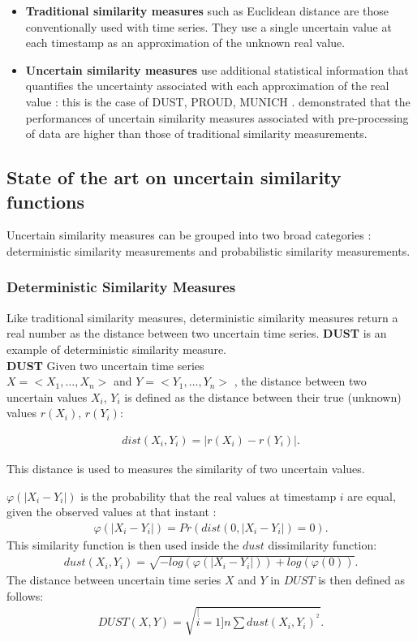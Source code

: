 \begin{itemize}
  \item \textbf{Traditional similarity measures} such as Euclidean distance are those conventionally used with time series. They use a single uncertain value at each timestamp as an approximation of
  the unknown real value.
  \item \textbf{Uncertain similarity measures} use additional statistical information that quantifies the uncertainty associated with each approximation of the real value : this is the case of
  DUST, PROUD, MUNICH \cite{dallachiesa}.  \cite{Orang2015} demonstrated that the performances of uncertain similarity measures associated with pre-processing of data are higher than those of traditional similarity measurements.
\end{itemize}


   

\subsection{State of the art on uncertain similarity functions}


Uncertain similarity measures  can be grouped into two broad categories : deterministic similarity measurements and probabilistic similarity measurements.

\subsubsection{Deterministic Similarity Measures} 
Like traditional similarity measures, deterministic  similarity measures  return a real number as the distance between two uncertain time series. \textbf{DUST} is an example of deterministic similarity measure.
\\
\textbf{DUST} \cite{murthy2013generalized} Given two uncertain time series \\ $X=<X_1, \ldots,X_n>$ and $Y=<Y_1, \ldots,Y_n>$ , the distance between two uncertain values $X_i$, $Y_i$ is defined as the distance between their true (unknown) values $r(X_i)$, $r(Y_i)$:

\begin{eqnarray}
 dist(X_i, Y_i) = |r(X_i) - r(Y_i)|.
\end{eqnarray}

 This distance is used to measures the similarity of two uncertain values. 

$\varphi(|X_{i}-Y_{i}|)$ is the probability that the real values at timestamp $i$   are equal, given the observed values at that instant :
\begin{eqnarray}
\varphi(|X_{i}-Y_{i}|)=Pr(dist(0, |X_{i}-Y_{i}|)=0).
\end{eqnarray}
This similarity function is then used inside the $dust$ dissimilarity function:
\begin{eqnarray}
dust(X_{i},Y_{i})=\sqrt{-log(\varphi(|X_{i}-Y_{i}|))+log(\varphi(0))}.
\end{eqnarray}
The distance between uncertain time series $X$ and $Y$ in $DUST$
is then defined as follows:
\begin{eqnarray}
DUST(X,Y)=\sqrt{\stackrel[i=1]{n}{\sum}dust(X_{i},Y_{i})^{^{2}}}.
\end{eqnarray} 

